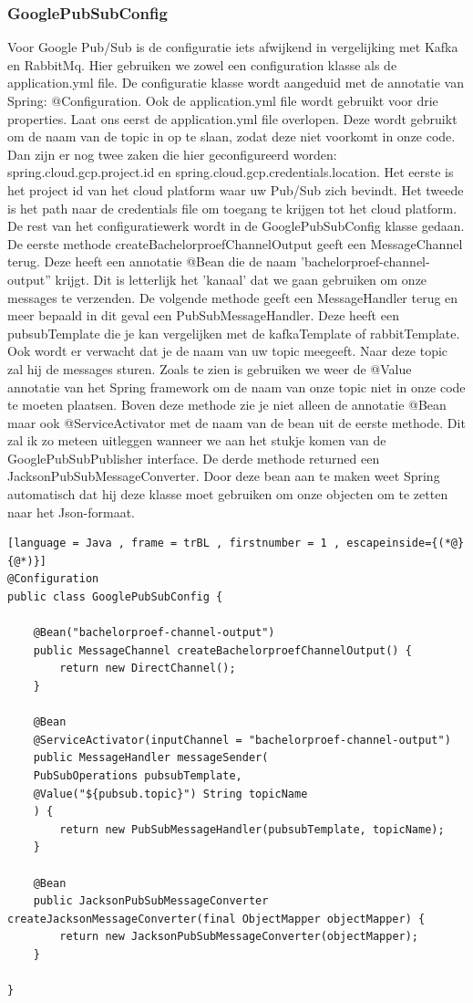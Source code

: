 \subsubsection{GooglePubSubConfig}
Voor Google Pub/Sub is de configuratie iets afwijkend in vergelijking met Kafka en RabbitMq. Hier gebruiken we zowel een configuration klasse als de application.yml file. De configuratie klasse wordt aangeduid met de annotatie van Spring: @Configuration. Ook de application.yml file wordt gebruikt voor drie properties. Laat ons eerst de application.yml file overlopen. Deze wordt gebruikt om de naam van de topic in op te slaan, zodat deze niet voorkomt in onze code. Dan zijn er nog twee zaken die hier geconfigureerd worden: spring.cloud.gcp.project.id en spring.cloud.gcp.credentials.location. Het eerste is het project id van het cloud platform waar uw Pub/Sub zich bevindt. Het tweede is het path naar de credentials file om toegang te krijgen tot het cloud platform. De rest van het configuratiewerk wordt in de GooglePubSubConfig klasse gedaan. De eerste methode createBachelorproefChannelOutput geeft een MessageChannel terug. Deze heeft een annotatie @Bean die de naam 'bachelorproef-channel-output'' krijgt. Dit is letterlijk het 'kanaal' dat we gaan gebruiken om onze messages te verzenden. De volgende methode geeft een MessageHandler terug en meer bepaald in dit geval een PubSubMessageHandler. Deze heeft een pubsubTemplate die je kan vergelijken met de kafkaTemplate of rabbitTemplate. Ook wordt er verwacht dat je de naam van uw topic meegeeft. Naar deze topic zal hij de messages sturen. Zoals te zien is gebruiken we weer de @Value annotatie van het Spring framework om de naam van onze topic niet in onze code te moeten plaatsen. Boven deze methode zie je niet alleen de annotatie @Bean maar ook @ServiceActivator met de naam van de bean uit de eerste methode. Dit zal ik zo meteen uitleggen wanneer we aan het stukje komen van de GooglePubSubPublisher interface. De derde methode returned een JacksonPubSubMessageConverter. Door deze bean aan te maken weet Spring automatisch dat hij deze klasse moet gebruiken om onze objecten om te zetten naar het Json-formaat.

 \begin{lstlisting}[language = Java , frame = trBL , firstnumber = 1 , escapeinside={(*@}{@*)}]
@Configuration
public class GooglePubSubConfig {
    
    @Bean("bachelorproef-channel-output")
    public MessageChannel createBachelorproefChannelOutput() {
        return new DirectChannel();
    }
    
    @Bean
    @ServiceActivator(inputChannel = "bachelorproef-channel-output")
    public MessageHandler messageSender(
    PubSubOperations pubsubTemplate,
    @Value("${pubsub.topic}") String topicName
    ) {
        return new PubSubMessageHandler(pubsubTemplate, topicName);
    }
    
    @Bean
    public JacksonPubSubMessageConverter createJacksonMessageConverter(final ObjectMapper objectMapper) {
        return new JacksonPubSubMessageConverter(objectMapper);
    }
    
}
     \end{lstlisting}
